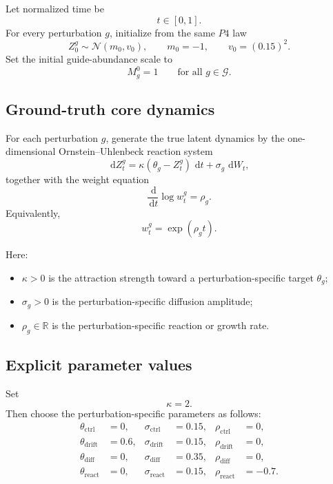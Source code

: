 \documentclass[11pt]{article}
\newcommand{\R}{\mathbb{R}}
\newcommand{\dd}{\,\mathrm{d}}
\newcommand{\Gcal}{\mathcal{G}}
\begin{document}
Let normalized time be
\[
t\in[0,1].
\]
For every perturbation \(g\), initialize from the same $P4$ law
\begin{equation}
Z_0^g \sim \mathcal{N}(m_0,v_0),
\qquad
m_0=-1,
\qquad
v_0=(0.15)^2.
\label{eq:init_law}
\end{equation}
Set the initial guide-abundance scale to
\begin{equation}
M_g^0 = 1
\qquad
\text{for all } g\in\Gcal.
\label{eq:initial_mass_scale}
\end{equation}

\subsection{Ground-truth core dynamics}

For each perturbation \(g\), generate the true latent dynamics by the one-dimensional Ornstein--Uhlenbeck reaction system
\begin{equation}
\dd Z_t^g
=
\kappa(\theta_g-Z_t^g)\,\dd t
+
\sigma_g\,\dd W_t,
\label{eq:core_truth_state}
\end{equation}
together with the weight equation
\begin{equation}
\frac{\dd}{\dd t}\log w_t^g
=
\rho_g.
\label{eq:core_truth_weight}
\end{equation}
Equivalently,
\begin{equation}
w_t^g = \exp(\rho_g t).
\label{eq:core_truth_weight_solution}
\end{equation}

Here:
\begin{itemize}[leftmargin=2em]
    \item \(\kappa>0\) is the attraction strength toward a perturbation-specific target \(\theta_g\);
    \item \(\sigma_g>0\) is the perturbation-specific diffusion amplitude;
    \item \(\rho_g\in\R\) is the perturbation-specific reaction or growth rate.
\end{itemize}

\subsection{Explicit parameter values}

Set
\[
\kappa = 2.
\]
Then choose the perturbation-specific parameters as follows:
\begin{align}
\theta_{\mathrm{ctrl}} &= 0,
&
\sigma_{\mathrm{ctrl}} &= 0.15,
&
\rho_{\mathrm{ctrl}} &= 0,
\label{eq:ctrl_params}
\\[0.5ex]
\theta_{\mathrm{drift}} &= 0.6,
&
\sigma_{\mathrm{drift}} &= 0.15,
&
\rho_{\mathrm{drift}} &= 0,
\label{eq:drift_params}
\\[0.5ex]
\theta_{\mathrm{diff}} &= 0,
&
\sigma_{\mathrm{diff}} &= 0.35,
&
\rho_{\mathrm{diff}} &= 0,
\label{eq:diff_params}
\\[0.5ex]
\theta_{\mathrm{react}} &= 0,
&
\sigma_{\mathrm{react}} &= 0.15,
&
\rho_{\mathrm{react}} &= -0.7.
\label{eq:react_params}
\end{align}
\end{document}
